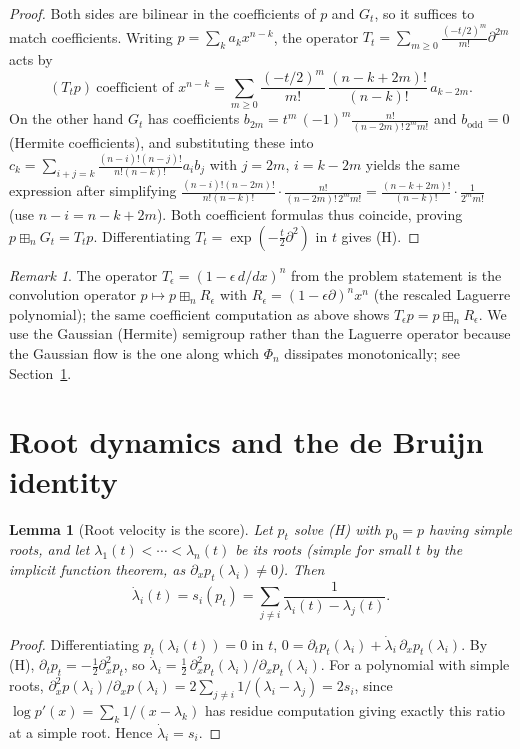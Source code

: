 \documentclass[12pt]{article}
\newtheorem{lemma}{Lemma}
\theoremstyle{remark}
\newtheorem*{remark}{Remark}
\newcommand{\boxp}{\boxplus_n}
\begin{document}
\begin{proof}
Both sides are bilinear in the coefficients of $p$ and $G_t$, so it suffices to
match coefficients.  Writing $p=\sum_k a_kx^{n-k}$, the operator
$T_t=\sum_{m\ge0}\frac{(-t/2)^m}{m!}\partial^{2m}$ acts by
\[
(T_tp)\ \text{coefficient of }x^{n-k}
=\sum_{m\ge0}\frac{(-t/2)^m}{m!}\,\frac{(n-k+2m)!}{(n-k)!}\,a_{k-2m}.
\]
On the other hand $G_t$ has coefficients
$b_{2m}=t^{m}\,(-1)^m\frac{n!}{(n-2m)!\,2^m m!}$ and $b_{\text{odd}}=0$
(Hermite coefficients), and substituting these into
$c_k=\sum_{i+j=k}\frac{(n-i)!(n-j)!}{n!(n-k)!}a_ib_j$ with $j=2m$, $i=k-2m$
yields the same expression after simplifying
$\frac{(n-i)!(n-2m)!}{n!(n-k)!}\cdot\frac{n!}{(n-2m)!\,2^mm!}
=\frac{(n-k+2m)!}{(n-k)!}\cdot\frac{1}{2^mm!}$ (use $n-i=n-k+2m$).  Both
coefficient formulas thus coincide, proving $p\boxp G_t=T_tp$.  Differentiating
$T_t=\exp(-\tfrac t2\partial^2)$ in $t$ gives (H).
\end{proof}

\begin{remark}
The operator $T_\epsilon=(1-\epsilon\,d/dx)^n$ from the problem statement is the
convolution operator $p\mapsto p\boxp R_\epsilon$ with
$R_\epsilon=(1-\epsilon\partial)^nx^n$ (the rescaled Laguerre polynomial); the
same coefficient computation as above shows $T_\epsilon p=p\boxp R_\epsilon$.
We use the Gaussian (Hermite) semigroup rather than the Laguerre operator
because the Gaussian flow is the one along which $\Phi_n$ dissipates
monotonically; see Section~\ref{sec:debruijn}.
\end{remark}

\section{Root dynamics and the de Bruijn identity}\label{sec:debruijn}

\begin{lemma}[Root velocity is the score]\label{lem:rootvel}
Let $p_t$ solve (H) with $p_0=p$ having simple roots, and let
$\lambda_1(t)<\cdots<\lambda_n(t)$ be its roots (simple for small $t$ by the
implicit function theorem, as $\partial_xp_t(\lambda_i)\ne0$).  Then
\[
\dot\lambda_i(t)=s_i(p_t)=\sum_{j\neq i}\frac{1}{\lambda_i(t)-\lambda_j(t)} .
\]
\end{lemma}

\begin{proof}
Differentiating $p_t(\lambda_i(t))=0$ in $t$,
$0=\partial_tp_t(\lambda_i)+\dot\lambda_i\,\partial_xp_t(\lambda_i)$.
By (H), $\partial_tp_t=-\tfrac12\partial_x^2p_t$, so
$\dot\lambda_i=\tfrac12\,\partial_x^2p_t(\lambda_i)/\partial_xp_t(\lambda_i)$.
For a polynomial with simple roots,
$\partial_x^2p(\lambda_i)/\partial_xp(\lambda_i)
=2\sum_{j\neq i}1/(\lambda_i-\lambda_j)=2s_i$, since
$\log p'(x)=\sum_k 1/(x-\lambda_k)$ has residue computation giving exactly this
ratio at a simple root.  Hence $\dot\lambda_i=s_i$.
\end{proof}
\end{document}
